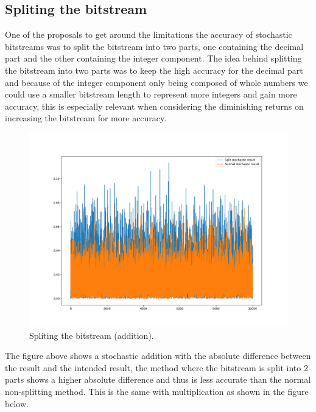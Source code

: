 \documentclass[a4paper,oneside,phd,etd]{BYUPhys}
\begin{document}
\subsection{Spliting the bitstream}
One of the proposals to get around the limitations the accuracy of stochastic bitstreams was to split the bitstream into two parts, one containing the decimal part and the other containing the integer component. The idea behind splitting the bitstream into two parts was to keep the high accuracy for the decimal part and because of the integer component only being composed of whole numbers we could use a smaller bitstream length to represent more integers and gain more accuracy, this is especially relevant when considering the diminishing returns on increasing the bitstream for more accuracy.
\begin{figure}[H]
\centering
\includegraphics[scale=0.4]{results/Figure_4.png}
\caption{Spliting the bitstream (addition).}
\label{fig:spliting}
\end{figure}
The figure above shows a stochastic addition with the absolute difference between the result and the intended result, the method where the bitstream is split into 2 parts shows a higher absolute difference and thus is less accurate than the normal non-splitting method. This is the same with multiplication as shown in the figure below.
\end{document}
